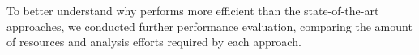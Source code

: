 To better understand why \@approach performs more efficient than the state-of-the-art approaches, we conducted further performance evaluation, comparing the amount of
resources and analysis efforts required by each approach. 

